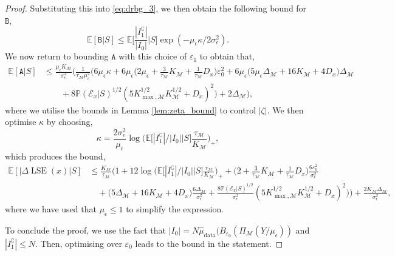 \documentclass[10pt]{article}
\theoremstyle{plain}
\theoremstyle{definition}
\theoremstyle{remark}
\newcommand{\M}{{\mathcal{M}}}
\newcommand{\lse}{\operatorname{LSE}}
\newcommand{\E}{\mathbb{E}}
\newcommand{\prob}{\mathbb{P}}
\newcommand{\gap}{\Delta_\M}
\begin{document}
\begin{proof}
Substituting this into \eqref{eq:drbg_3}, we then obtain the following bound for \(\mathtt{B}\),
\begin{equation*}
    \E[\mathtt{B}|S] \leq \E \bigg [ \frac{|I_1^\complement|}{|I_0|} \bigg | S \bigg ] \exp(-\mu_\epsilon\kappa/2\sigma^2_\epsilon).
\end{equation*}
We now return to bounding \(\mathtt{A}\) with this choice of \(\varepsilon_1\)
to obtain that,
\begin{align*}
    \E[\mathtt{A}|S] &\leq \frac{\mu_\epsilon K_\M}{\sigma^2_\epsilon} \bigg ( \frac{1}{\tau_\M \mu_\epsilon^2} \bigg ( 6 \mu_\epsilon \kappa + 6 \mu_\epsilon \Big ( 2\mu_\epsilon + \tfrac{3}{\tau_\M} K_\M + \tfrac{1}{\tau_\M} D_x \Big ) \varepsilon_0^2 + 6 \mu_\epsilon \Big ( 5 \mu_\epsilon \gap + 16 K_\M + 4 D_x \Big ) \gap \\
    & \qquad + 8 \prob(\mathcal{E}_x|S)^{1/2} (5 K_{\max, \M}^{1/2} K_\M^{1/2} + D_x)^2 \bigg ) + 2 \gap \bigg ),
\end{align*}
where we utilise the bounds in Lemma \ref{lem:zeta_bound} to control \(|\zeta|\).
We then optimise \(\kappa\) by choosing,
\begin{equation*}
    \kappa = \frac{2 \sigma_\epsilon^2}{\mu_\epsilon} \log \bigg ( \E \Big [ |I_1^\complement|/|I_0| \Big | S \Big ] \frac{\tau_\M}{K_\M} \bigg )_+,
\end{equation*}
which produces the bound,
\begin{align*}
    \E[|\Delta \lse(x)|S] &\leq \frac{K_\M}{\tau_\M} \bigg ( 1 + 12 \log \Big ( \E \Big [ |I_1^\complement|/|I_0| \Big | S \Big ] \tfrac{\tau_\M}{K_\M} \Big )_+ + \Big ( 2 + \tfrac{3}{\tau_\M} K_\M + \tfrac{1}{\tau_\M} D_x \Big ) \frac{6\varepsilon_0^2}{\sigma_\epsilon^2} \\
    & \quad + \Big ( 5 \gap + 16 K_\M + 4 D_x \Big ) \frac{6 \gap}{\sigma_\epsilon^2} +\frac{8 \prob(\mathcal{E}_x|S)^{1/2}}{\sigma_\epsilon^2} (5 K_{\max, \M}^{1/2} K_\M^{1/2} + D_x)^2 \bigg ) \bigg ) + \frac{2 K_\M \gap}{\sigma_\epsilon^2},
\end{align*}
where we have used that \(\mu_\epsilon \leq 1\) to simplify the expression.

To conclude the proof, we use the fact that \(|I_0| = N \hat{\mu}_{\operatorname{data}}(B_{\varepsilon_0}(\Pi_\M(Y/\mu_\epsilon))\) and \(|I_1^\complement| \leq N\). Then, optimising over \(\varepsilon_0\) leads to the bound in the statement.
\end{proof}
\end{document}
